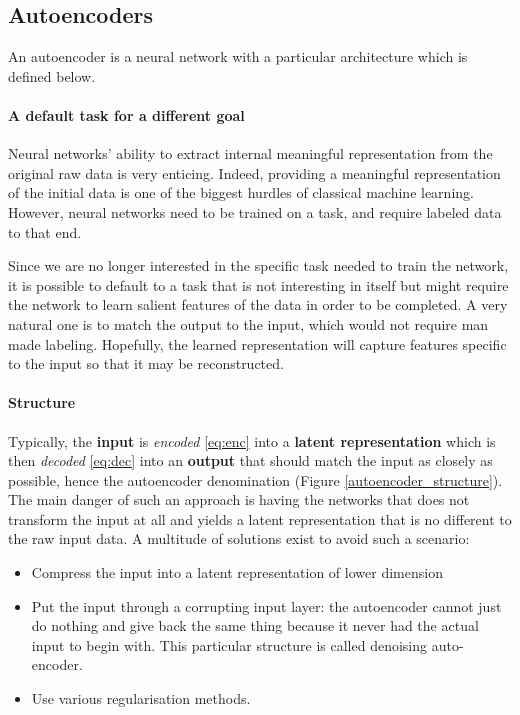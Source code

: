 \documentclass[conference]{IEEEtran}
\begin{document}
\subsection{Autoencoders}

An autoencoder \cite{Hinton504} is a neural network with a particular
architecture which is defined below.

\paragraph{A default task for a different goal}

Neural networks' ability to extract internal meaningful representation from the
original raw data is very enticing. Indeed, providing a meaningful
representation of the initial data is one of the biggest hurdles of classical
machine learning. However, neural networks need to be trained on a task, and
require labeled data to that end. 

Since we are no longer interested in the specific task needed to train the
network, it is possible to default to a task that is not interesting in itself
but might require the network to learn salient features of the data in order to
be completed. A very natural one is to match the output to the input, which
would not require man made labeling. Hopefully, the learned representation will
capture features specific to the input so that it may be reconstructed.

\paragraph{Structure}

Typically, the \textbf{input} is \textit{encoded} \eqref{eq:enc} into a \textbf{latent
  representation} which is then \textit{decoded} \eqref{eq:dec} into an \textbf{output} that
should match the input as closely as possible, hence the autoencoder
denomination (Figure \ref{autoencoder_structure}). The main danger of such an approach is having the networks that
does not transform the input at all and yields a latent representation that is
no different to the raw input data. A multitude of solutions exist to avoid such
a scenario:
\begin{itemize}
\item Compress the input into a latent representation of lower dimension
\item Put the input through a corrupting input layer: the autoencoder cannot
  just do nothing and give back the same thing because it never had the actual
  input to begin with. This particular structure is called denoising auto-encoder.
\item Use various regularisation methods.
\end{itemize}
\end{document}
